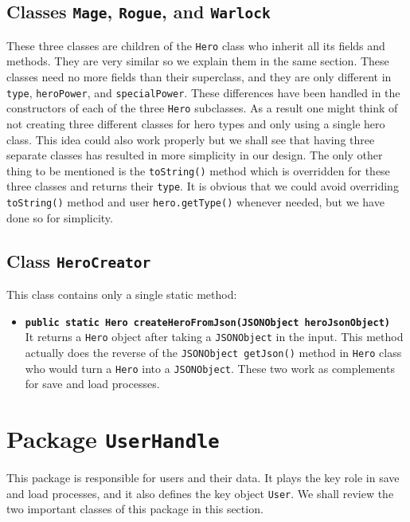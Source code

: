 \documentclass[a4paper]{article}
\begin{document}
\subsection{Classes \texttt{Mage}, \texttt{Rogue}, and \texttt{Warlock}}
These three classes are children of the \texttt{Hero} class who inherit all its fields and methods. They are very similar so we explain them in the same section. These classes need no more fields than their superclass, and they are only different in \texttt{type}, \texttt{heroPower}, and \texttt{specialPower}. These differences have been handled in the constructors of each of the three \texttt{Hero} subclasses. As a result one might think of not creating three different classes for hero types and only using a single hero class. This idea could also work properly but we shall see that having three separate classes has resulted in more simplicity in our design. The only other thing to be mentioned is the \texttt{toString()} method which is overridden for these three classes and returns their \texttt{type}. It is obvious that we could avoid overriding \texttt{toString()} method and user \texttt{hero.getType()} whenever needed, but we have done so for simplicity.

\subsection{Class \texttt{HeroCreator}}
This class contains only a single static method:
\begin{itemize}
	\item \textbf{\texttt{public static Hero createHeroFromJson(JSONObject heroJsonObject)}}\\
	It returns a \texttt{Hero} object after taking a \texttt{JSONObject} in the input. This method actually does the reverse of the \texttt{JSONObject getJson()} method in \texttt{Hero} class who would turn a \texttt{Hero} into a \texttt{JSONObject}. These two work as complements for save and load processes.
	
\end{itemize}

\clearpage
\section{Package \texttt{UserHandle}}
This package is responsible for users and their data. It plays the key role in save and load processes, and it also defines the key object \texttt{User}. We shall review the two important classes of this package in this section.
\end{document}
